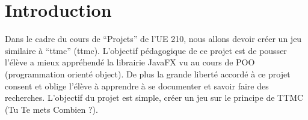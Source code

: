 \newpage
\section*{Introduction}
\label{sec:intro}
Dans le cadre du cours de ``Projets'' de l'UE 210, nous allons devoir créer un jeu similaire à ``\acrlong{ttmc}'' (\acrshort{ttmc}). L'objectif pédagogique de ce projet est de pousser l'élève a mieux appréhendé la librairie JavaFX vu au cours de 
POO (programmation orienté object). De plus la grande liberté accordé à ce projet consent et oblige l'élève à apprendre à se documenter et savoir faire des recherches.  L'objectif du projet est simple, créer un jeu sur le principe de TTMC (Tu Te 
mets Combien ?).  
